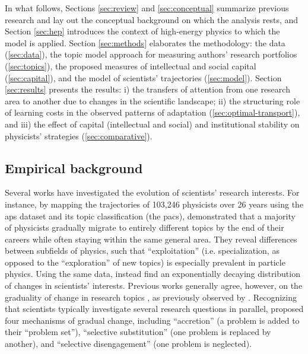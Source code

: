 \documentclass{article}
\begin{document}
In what follows, Sections \ref{sec:review} and \ref{sec:conceptual} summarize previous research and lay out the conceptual background on which the analysis rests, and Section \ref{sec:hep} introduces the context of high-energy physics to which the model is applied. 
Section \ref{sec:methods} elaborates the methodology: the data (\ref{sec:data}), the topic model approach for measuring authors' research portfolios (\ref{sec:topics}), the proposed measures of intellectual and social capital (\ref{sec:capital}), and the model of scientists' trajectories (\ref{sec:model}).
Section \ref{sec:results} presents the results: i) the transfers of attention from one research area to another due to changes in the scientific landscape; ii) the structuring role of learning costs in the observed patterns of adaptation (\ref{sec:optimal-transport}), and iii) the effect of capital (intellectual and social) and institutional stability on physicists' strategies (\ref{sec:comparative}). %


\subsection{\label{sec:review}Empirical background}

Several works have investigated the evolution of scientists' research interests. For instance, by mapping the trajectories of 103,246 physicists over 26 years using the \gls{aps} dataset and its topic classification (the \gls{pacs}), \citet{Aleta2019} demonstrated that a majority of physicists gradually migrate to entirely different topics by the end of their careers while often staying within the same general area. They reveal differences between subfields of physics, such that ``exploitation'' (i.e. specialization, as opposed to the ``exploration'' of new topics) is especially prevalent in particle physics.  Using the same data, \citet{Jia2017} instead find an exponentially decaying distribution of changes in scientists' interests. %
Previous works generally agree, however, on the graduality of change in research topics \citep{Jia2017,Aleta2019,Zeng2019}, as previously observed by  \citet{Gieryn1978}. Recognizing that scientists typically investigate several research questions in parallel, \citeauthor{Gieryn1978} proposed four mechanisms of gradual change, including ``accretion'' (a problem is added to their ``problem set''),  ``selective substitution'' (one problem is replaced by another), and ``selective disengagement'' (one problem is neglected).
\end{document}
